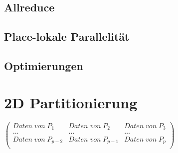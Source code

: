 \subsection{Allreduce} %
\label{sub:allreduce}


\subsection{Place-lokale Parallelität} %
\label{sub:place_lokale_parallelit_t}


\subsection{Optimierungen} %
\label{sub:optimierungen}



\section{2D Partitionierung} %
\label{sec:2d_partitionierung}
$\left( \begin{array}{c|c|c}
	Daten\;von\;P_1  & Daten\;von\;P_2 & Daten\;von\;P_3 \\	\hline
	\dots & \dots & \dots \\ \hline
	Daten\;von\;P_{p-2}  & Daten\;von\;P_{p-1} & Daten\;von\;P_p \\
\end{array} \right)$
